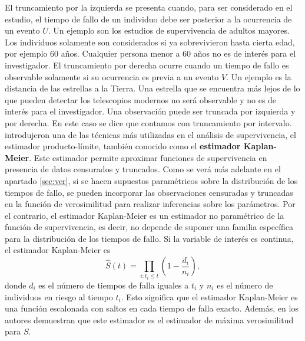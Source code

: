 \documentclass[11pt,a4paper]{article}
\begin{document}
El truncamiento por la izquierda se presenta cuando, para ser considerado en el estudio, el tiempo de fallo de un individuo debe ser posterior  a la ocurrencia de un evento $U$. Un ejemplo son los estudios de supervivencia de adultos mayores. Los individuos solamente son considerados si ya sobrevivieron hasta cierta edad, por ejemplo 60 años. Cualquier persona menor a 60 años no es de interés para el investigador. El truncamiento por derecha ocurre cuando un tiempo de fallo es observable solamente si su ocurrencia es previa a un evento $V$. Un ejemplo es la distancia de las estrellas a la Tierra. Una estrella que se encuentra más lejos de lo que pueden detectar los telescopios modernos no será observable y no es de interés para el investigador. Una observación puede ser truncada por izquierda y por derecha. En este caso se dice que contamos con truncamiento por intervalo.\\

\citet{kaplan-meier} introdujeron una de las técnicas más utilizadas en el análisis de supervivencia, el estimador producto-límite, también conocido como el \textbf{estimador Kaplan-Meier}. Este estimador permite aproximar funciones de supervivencia en presencia de datos censurados y truncados. Como se verá más adelante en el apartado \ref{sec:ver}, si se hacen supuestos paramétricos sobre la distribución de los tiempos de fallo, se pueden incorporar las observaciones censuradas y truncadas en la función de verosimilitud para realizar inferencias sobre los parámetros. Por el contrario, el estimador Kaplan-Meier es un estimador no paramétrico de la función de supervivencia, es decir, no depende de suponer una familia específica para la distribución de los tiempos de fallo. Si la variable de interés es continua, el estimador Kaplan-Meier es
\begin{equation}
\label{eq:km}
\hat{S}(t) = \prod_{i: t_i \leq t} \left( 1-\frac{d_i}{n_i}\right),
\end{equation}
donde $d_i$ es el número de tiempos de falla iguales a $t_i$ y $n_i$ es el número de individuos en riesgo al tiempo $t_i$. Esto significa que el estimador Kaplan-Meier es una función escalonada con saltos en cada tiempo de falla exacto. Además, en \cite{kaplan-meier} los autores demuestran que este estimador es el estimador de máxima verosimilitud para $S$.\\
\end{document}
